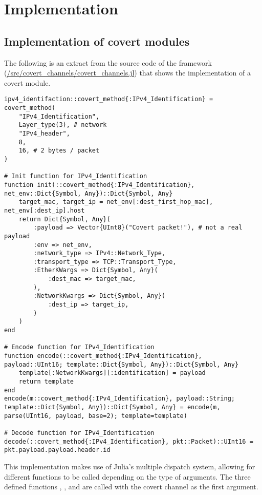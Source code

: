\chapter{Implementation}

\section{Implementation of covert modules}
\label{sec:impl_cov_mod}

The following is an extract from the source code of the framework (\url{/src/covert_channels/covert_channels.jl}) that shows the implementation of a covert module.

\begin{lstlisting}[language=JuliaLocal, style=julia]
ipv4_identifaction::covert_method{:IPv4_Identification} = covert_method(
    "IPv4_Identification",
    Layer_type(3), # network
    "IPv4_header",
    8,
    16, # 2 bytes / packet
)

# Init function for IPv4_Identification
function init(::covert_method{:IPv4_Identification}, net_env::Dict{Symbol, Any})::Dict{Symbol, Any}
    target_mac, target_ip = net_env[:dest_first_hop_mac], net_env[:dest_ip].host
    return Dict{Symbol, Any}(
        :payload => Vector{UInt8}("Covert packet!"), # not a real payload
        :env => net_env,
        :network_type => IPv4::Network_Type,
        :transport_type => TCP::Transport_Type,
        :EtherKWargs => Dict{Symbol, Any}(
            :dest_mac => target_mac,
        ),
        :NetworkKwargs => Dict{Symbol, Any}(
            :dest_ip => target_ip,
        )
    )
end

# Encode function for IPv4_Identification
function encode(::covert_method{:IPv4_Identification}, payload::UInt16; template::Dict{Symbol, Any})::Dict{Symbol, Any}
    template[:NetworkKwargs][:identification] = payload
    return template
end
encode(m::covert_method{:IPv4_Identification}, payload::String; template::Dict{Symbol, Any})::Dict{Symbol, Any} = encode(m, parse(UInt16, payload, base=2); template=template)

# Decode function for IPv4_Identification
decode(::covert_method{:IPv4_Identification}, pkt::Packet)::UInt16 = pkt.payload.payload.header.id
\end{lstlisting}

This implementation makes use of Julia's multiple dispatch system, allowing for different functions to be called depending on the type of arguments. The three defined functions , , and  are called with the covert channel as the first argument.


